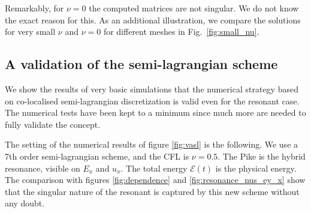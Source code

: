 Remarkably, for $\nu=0$ the computed matrices are not singular. We do not know the exact reason for this.
As an additional illustration, we compare the solutions for very small $\nu$ and $\nu=0$ for different meshes in Fig.~\ref{fig:small_nu}. 

\FloatBarrier

\subsection{A validation of the semi-lagrangian scheme}

We show the results of very basic simulations that the numerical strategy 
based on co-localised semi-lagrangian discretization is valid even for the resonant 
case.
The numerical tests have been kept to a minimum since much more are needed to fully validate
the concept.

The setting of the numerical results of figure \ref{fig:vasl}
is the following. We use a 7th order semi-lagrangian scheme, and the CFL is $\nu=0.5$.
The Pike is the hybrid resonance, visible on $E_x$ and $u_x$.
The total energy $\mathcal E(t)$ is the physical energy. 
The comparison with figures \ref{fig:dependence} and \ref{fig:resonance_nus_ey_x} show that the 
singular nature of the resonant is captured by this new scheme without any doubt.

